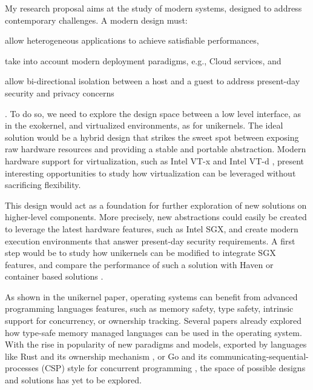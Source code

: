 My research proposal aims at the study of modern systems, designed to address contemporary challenges.
A modern design must:
\begin{enumerate*}
	\item allow heterogeneous applications to achieve satisfiable performances,
	\item take into account modern deployment paradigms, e.g., Cloud services, and 
	\item allow bi-directional isolation between a host and a guest to address present-day security and privacy concerns
\end{enumerate*}.
To do so, we need to explore the design space between a low level interface, as in the exokernel, and virtualized environments, as for unikernels.
The ideal solution would be a hybrid design that strikes the sweet spot between exposing raw hardware resources and providing a stable and portable abstraction.
Modern hardware support for virtualization, such as Intel VT-x \cite{DBLP:journals/computer/UhligNRSMABKLS05} and Intel VT-d \cite{intelVTD}, present interesting opportunities to study how virtualization can be leveraged without sacrificing flexibility.

This design would act as a foundation for further exploration of new solutions on higher-level components. 
More precisely, new abstractions could easily be created to leverage the latest hardware features, such as Intel SGX, and create modern execution environments that answer present-day security requirements.
A first step would be to study how unikernels can be modified to integrate SGX features, and compare the performance of such a solution with Haven or container based solutions \cite{DBLP:conf/osdi/ArnautovTGKMPLM16}.

As shown in the unikernel paper, operating systems can benefit from advanced programming languages features, such as memory safety, type safety, intrinsic support for concurrency, or ownership tracking.
Several papers \cite{DBLP:conf/asplos/MadhavapeddyMRSSGSHC13,DBLP:conf/sosp/BershadSPSFBCE95,DBLP:journals/sigops/HuntL07} already explored how type-safe memory managed languages can be used in the operating system.
With the rise in popularity of new paradigms and models, exported by languages like Rust and its ownership mechanism \cite{rust}, or Go and its communicating-sequential-processes (CSP) style for concurrent programming \cite{golang}, the space of possible designs and solutions has yet to be explored.